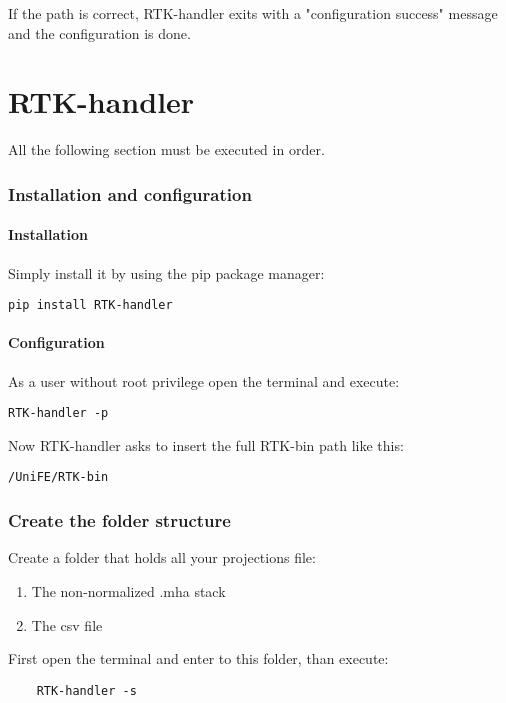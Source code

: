 \documentclass[a4paper,11pt, oneside]{article}
\begin{document}
    
    
  
  If the path is correct, RTK-handler exits with a "configuration success" message and the configuration is done.
  
  \part{ RTK-handler }
    All the following section must be executed in order.
    
    \section{ Installation and configuration }
    \subsection{ Installation }
    Simply install it by using the pip package manager:
    \begin{lstlisting}[]
    pip install RTK-handler
    \end{lstlisting}
    \subsection{ Configuration }
    As a user without root privilege open the terminal and execute:
   \begin{lstlisting}[]
    RTK-handler -p
    \end{lstlisting}
    
    Now RTK-handler asks to insert the full RTK-bin path like this:
    \begin{lstlisting}[]
    /UniFE/RTK-bin
    \end{lstlisting}
    
    \section{ Create the folder structure }
    Create a folder that holds all your projections file:
    \begin{enumerate}
      \item The non-normalized .mha stack
      \item The csv file    
    \end{enumerate}
    
    \par First open the terminal and enter to this folder, than execute:
    \begin{lstlisting}
    RTK-handler -s  
    \end{lstlisting}
    
\end{document}
